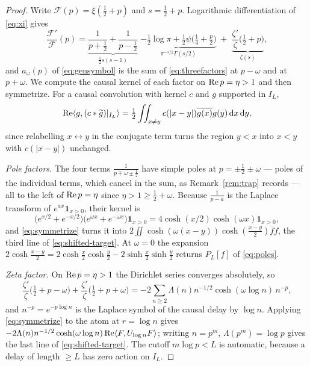 \begin{proof}
Write $\mathcal F(p)=\xi(\frac12+p)$ and $s=\frac12+p$. Logarithmic
differentiation of \eqref{eq:xi} gives
\begin{equation}\label{eq:threefactors}
 \frac{\mathcal F'}{\mathcal F}(p)
 =\underbrace{\frac1{p+\frac12}+\frac1{p-\frac12}}_{\frac12s(s-1)}
 \;\underbrace{-\tfrac12\log\pi+\tfrac12\psi\big(\tfrac14+\tfrac p2\big)}
   _{\pi^{-s/2}\Gamma(s/2)}
 \;+\;\underbrace{\frac{\zeta'}{\zeta}\big(\tfrac12+p\big)}_{\zeta(s)},
\end{equation}
and $a_\omega(p)$ of \eqref{eq:gensymbol} is the sum of \eqref{eq:threefactors}
at $p-\omega$ and at $p+\omega$. We compute the causal kernel of each factor on
$\operatorname{Re} p=\eta>1$ and then symmetrize. For a causal convolution with kernel $c$ and
$g$ supported in $I_L$,
\begin{equation}\label{eq:symmetrize}
 \operatorname{Re}\langle g,(c*\widetilde g)|_{I_L}\rangle
 =\tfrac12\iint_{x\neq y}c(|x-y|)\overline{g(x)}g(y)\,\mathrm d x\,\mathrm d y ,
\end{equation}
since relabelling $x\leftrightarrow y$ in the conjugate term turns the region
$y<x$ into $x<y$ with $c(|x-y|)$ unchanged.

\emph{Pole factors.} The four terms $\frac1{p\mp\omega\pm\frac12}$ have simple
poles at $p=\pm\frac12\pm\omega$ --- poles of the individual terms, which cancel
in the sum, as Remark~\ref{rem:trap} records --- all to the left of
$\operatorname{Re} p=\eta$ since
$\eta>1\geq\frac12+\omega$. Because $\frac1{p-a}$ is the Laplace transform of
$e^{ax}\mathbf1_{x>0}$, their kernel is
\[
 \big(e^{x/2}+e^{-x/2}\big)\big(e^{\omega x}+e^{-\omega x}\big)\mathbf1_{x>0}
 =4\cosh(x/2)\cosh(\omega x)\mathbf1_{x>0},
\]
and \eqref{eq:symmetrize} turns it into
$2\iint\cosh(\omega(x-y))\cosh(\frac{x-y}2)\overline f f$, the third line of
\eqref{eq:shifted-target}. At $\omega=0$ the expansion
$2\cosh\frac{x-y}2=2\cosh\frac x2\cosh\frac y2-2\sinh\frac x2\sinh\frac y2$
returns $P_L[f]$ of \eqref{eq:poles}.

\emph{Zeta factor.} On $\operatorname{Re} p=\eta>1$ the Dirichlet series converges absolutely,
so
\[
 \frac{\zeta'}{\zeta}\big(\tfrac12+p-\omega\big)
 +\frac{\zeta'}{\zeta}\big(\tfrac12+p+\omega\big)
 =-2\sum_{n\geq2}\Lambda(n)n^{-1/2}\cosh(\omega\log n)\,n^{-p},
\]
and $n^{-p}=e^{-p\log n}$ is the Laplace symbol of the causal delay by $\log n$.
Applying \eqref{eq:symmetrize} to the atom at $r=\log n$ gives
$-2\Lambda(n)n^{-1/2}\cosh(\omega\log n)\operatorname{Re}\langle F,U_{\log n}F\rangle$; writing
$n=p^m$, $\Lambda(p^m)=\log p$ gives the last line of
\eqref{eq:shifted-target}. The cutoff $m\log p<L$ is automatic, because a delay
of length $\geq L$ has zero action on $I_L$.


\end{proof}

